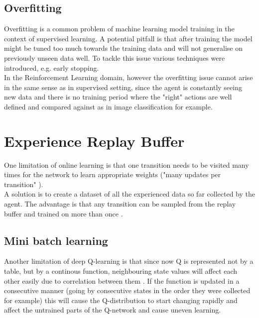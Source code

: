 \subsection{Overfitting}

Overfitting is a common problem of machine learning 
model training in the context of supervised learning.
A potential pitfall is that after training the model
might be tuned too much towards the training data
and will not generalise on previously unseen data well.
To tackle this issue various techniques were introduced, 
e.g. early stopping. \\

In the Reinforcement Learning domain, however the 
overfitting issue cannot arise in the same sense as in
supervised setting, since the agent is constantly 
seeing new data and there is no training period where
the "right" actions are well defined and compared against
as in image classification for example.


\section{Experience Replay Buffer}

One limitation of online learning is that one transition needs to be visited many times for the network to learn appropriate weights ("many updates per transition" \cite{lecture_dqn}). \\

A solution is to create a dataset of all the experienced data so far collected by the agent. The advantage is that any transition can be sampled from the replay buffer and trained on more than once \cite{lecture_dqn}. 

\subsection{Mini batch learning }

Another limitation of deep Q-learning is that since now Q is represented not by a table, but by a continous function, neighbouring state values will affect each other easily due to correlation between them \cite{lecture_dqn} . If the function is updated in a consecutive manner (going by consecutive states in the order they were collected for example) this will cause the Q-distribution to start changing rapidly and affect the untrained parts of the Q-network and cause uneven learning. \\

